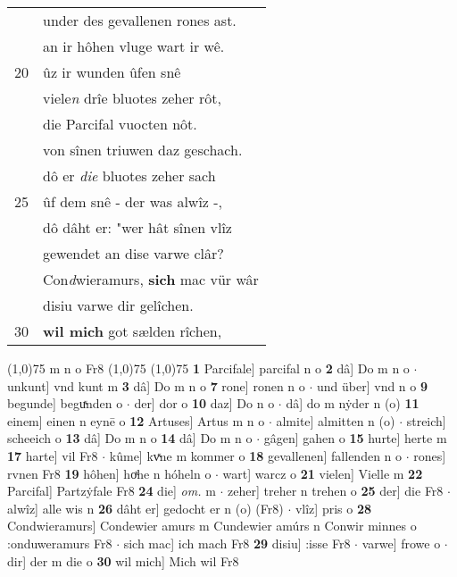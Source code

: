 \documentclass[8pt,a4paper,notitlepage]{article}
\begin{document}
\begin{table}[ht]
\begin{minipage}[t]{0.5\linewidth}
\begin{tabular}{rl}
 & under des gevallenen rones ast.\\ 
 & an ir hôhen vluge wart ir wê.\\ 
20 & ûz ir wunden ûfen snê\\ 
 & viele\textit{n} drîe bluotes zeher rôt,\\ 
 & die Parcifal vuocten nôt.\\ 
 & von sînen triuwen daz geschach.\\ 
 & dô er \textit{die} bluotes zeher sach\\ 
25 & ûf dem snê - der was alwîz -,\\ 
 & dô dâht er: "wer hât sînen vlîz\\ 
 & gewendet an dise varwe clâr?\\ 
 & Con\textit{d}wieramurs, \textbf{sich} mac vür wâr\\ 
 & disiu varwe dir gelîchen.\\ 
30 & \textbf{wil mich} got sælden rîchen,\\ 
\end{tabular}
\scriptsize
\line(1,0){75} \newline
m n o Fr8 \newline
\line(1,0){75} \newline
\newline
\line(1,0){75} \newline
\textbf{1} Parcifale] parcifal n o \textbf{2} dâ] Do m n o  $\cdot$ unkunt] vnd kunt m \textbf{3} dâ] Do m n o \textbf{7} rone] ronen n o  $\cdot$ und über] vnd n o \textbf{9} begunde] beguͯnden o  $\cdot$ der] dor o \textbf{10} daz] Do n o  $\cdot$ dâ] do m nẏder n (o) \textbf{11} einem] einen n eynē o \textbf{12} Artuses] Artus m n o  $\cdot$ almite] almitten n (o)  $\cdot$ streich] scheeich o \textbf{13} dâ] Do m n o \textbf{14} dâ] Do m n o  $\cdot$ gâgen] gahen o \textbf{15} hurte] herte m \textbf{17} harte] vil Fr8  $\cdot$ kûme] kvͯne m kommer o \textbf{18} gevallenen] fallenden n o  $\cdot$ rones] rvnen Fr8 \textbf{19} hôhen] hoͯhe n hóheln o  $\cdot$ wart] warcz o \textbf{21} vielen] Vielle m \textbf{22} Parcifal] Partzẏfale Fr8 \textbf{24} die] \textit{om.} m  $\cdot$ zeher] treher n trehen o \textbf{25} der] die Fr8  $\cdot$ alwîz] alle wis n \textbf{26} dâht er] gedocht er n (o) (Fr8)  $\cdot$ vlîz] pris o \textbf{28} Condwieramurs] Condewier amurs m Cundewier amúrs n Conwir minnes o :onduweramurs Fr8  $\cdot$ sich mac] ich mach Fr8 \textbf{29} disiu] :isse Fr8  $\cdot$ varwe] frowe o  $\cdot$ dir] der m die o \textbf{30} wil mich] Mich wil Fr8 \newline
\end{minipage}
\end{table}
\end{document}
